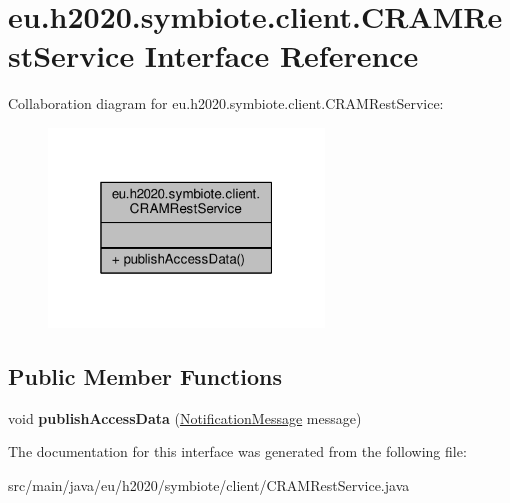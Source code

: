 \hypertarget{interfaceeu_1_1h2020_1_1symbiote_1_1client_1_1CRAMRestService}{}\section{eu.\+h2020.\+symbiote.\+client.\+C\+R\+A\+M\+Rest\+Service Interface Reference}
\label{interfaceeu_1_1h2020_1_1symbiote_1_1client_1_1CRAMRestService}


Collaboration diagram for eu.\+h2020.\+symbiote.\+client.\+C\+R\+A\+M\+Rest\+Service\+:\nopagebreak
\begin{figure}[H]
\begin{center}
\leavevmode
\includegraphics[width=208pt]{interfaceeu_1_1h2020_1_1symbiote_1_1client_1_1CRAMRestService__coll__graph}
\end{center}
\end{figure}
\subsection*{Public Member Functions}
\begin{DoxyCompactItemize}
\item 
\mbox{\label{interfaceeu_1_1h2020_1_1symbiote_1_1client_1_1CRAMRestService_a0720287dfbf2659145f1bf615d34dad6}} 
void {\bfseries publish\+Access\+Data} (\hyperlink{classeu_1_1h2020_1_1symbiote_1_1core_1_1cci_1_1accessNotificationMessages_1_1NotificationMessage}{Notification\+Message} message)
\end{DoxyCompactItemize}


The documentation for this interface was generated from the following file\+:\begin{DoxyCompactItemize}
\item 
src/main/java/eu/h2020/symbiote/client/C\+R\+A\+M\+Rest\+Service.\+java\end{DoxyCompactItemize}
